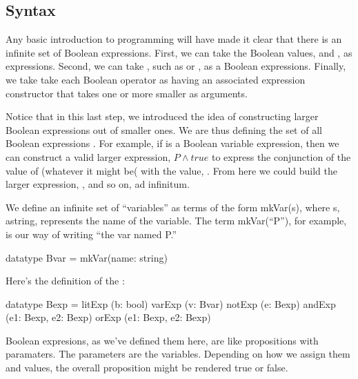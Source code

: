 \documentclass[letterpaper,10pt,english]{sphinxmanual}
\begin{document}
\subsection{Syntax}
\label{\detokenize{09-propositional-logic:syntax}}
Any basic introduction to programming will have made it clear that
there is an infinite set of Boolean expressions. First, we can take
the Boolean values,  and , as  expressions.
Second, we can take , such as  or , as a
Boolean  expressions. Finally, we take take each Boolean
operator as having an associated expression constructor that takes one
or more smaller  as arguments.

Notice that in this last step, we introduced the idea of constructing
larger Boolean expressions out of smaller ones. We are thus defining
the set of all Boolean expressions . For example, if 
is a Boolean variable expression, then we can construct a valid larger
expression, \(P \land true\) to express the conjunction of the
value of  (whatever it might be( with the value, . From here
we could build the larger expression, , and so
on, ad infinitum.

We define an infinite set of “variables” as terms of the form
mkVar(s), where s, astring, represents the name of the variable. The
term mkVar(“P”), for example, is our way of writing “the var named P.”

\begin{sphinxVerbatim}[commandchars=\\\{\}]
datatype Bvar = mkVar(name: string)
\end{sphinxVerbatim}

Here’s the definition of the :

\begin{sphinxVerbatim}[commandchars=\\\{\}]
datatype Bexp =
    litExp (b: bool) \textbar{}
    varExp (v: Bvar) \textbar{}
    notExp (e: Bexp) \textbar{}
    andExp (e1: Bexp, e2: Bexp) \textbar{}
    orExp (e1: Bexp, e2: Bexp)
\end{sphinxVerbatim}

Boolean expresions, as we’ve defined them here, are like propositions
with paramaters. The parameters are the variables. Depending on how we
assign them  and  values, the overall proposition might be
rendered true or false.
\end{document}
